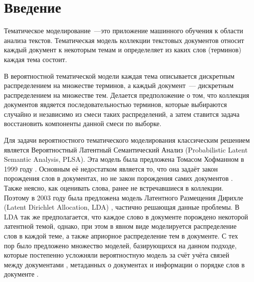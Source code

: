 \documentclass[12pt, twoside]{article}
\begin{document}

\maketitle
\linenumbers

\newcommand{\norm}{\mathop{\mathsf{norm}}\limits}

\section{Введение}
Тематическое моделирование~---это приложение машинного обучения к области анализа текстов. Тематическая модель коллекции текстовых документов относит каждый документ к некоторым темам и определеляет из каких слов (терминов) каждая тема состоит.

В вероятностной тематической модели каждая тема описывается дискретным распределением на множестве терминов,  а каждый документ~--- дискретным распределением на множестве тем. Делается предположение о том, что коллекция документов явдяется последовательностью терминов, которые выбираются случайно и независимо из смеси таких распределений, а затем ставится задача восстановить компоненты данной смеси по выборке.

Для  задачи вероятностного тематического моделирования  классическим решением является Вероятностный Латентный Семантический Анализ (Probabilistic Latent Semantic Analysis, PLSA). Эта модель  была предложена Томасом Хофманном в 1999 году \cite{hofmann1999probabilistic}. Основным её недостатком является то, что она задаёт закон порождения слов в документах, но не закон порождения самих документов \cite{daud2010knowledge}. Также  неясно, как оценивать слова, ранее не встречавшиеся в коллекции. Поэтому в 2003 году была предложена модель Латентного Размещения Дирихле (Latent Dirichlet Allocation, LDA) \cite{blei2003latent}, частично решающая данные проблемы. В LDA так же предполагается, что каждое слово в документе порождено некоторой латентной темой, однако, при этом в явном виде моделируется распределение слов в каждой теме, а также априорное
распределение тем в документе. С тех пор было предложено множество моделей, базирующихся на данном подходе, которые постепенно усложняли вероятностную модель за счёт учёта связей между документами \cite{cohn2001missing,mccallum2005author,nallapati2008link}, метаданных о документах \cite{steyvers2004probabilistic} и информации о порядке слов в документе \cite{gruber2007hidden,wallach2006topic}.
\end{document}
